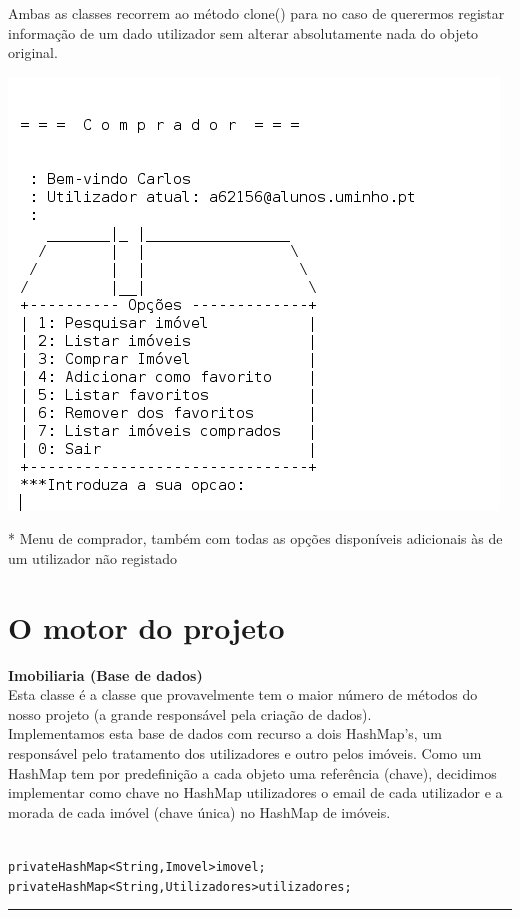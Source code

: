 \documentclass[12pt]{article}
\newenvironment{code}                    
{\textbf{
} \hspace{1cm} \hrulefill \\ 
\smallskip 
\begin{center}
\begin{minipage}{0.9\textwidth} 
\begin{alltt}\small}
{\end{alltt}
\end{minipage}
\end{center}
\hrule\smallskip
}
\begin{document}
Ambas as classes recorrem ao método clone() para no caso de querermos registar informação de um dado utilizador sem alterar absolutamente nada do objeto original.

\includegraphics[scale=0.5]{009.png}
\\
\begin{footnotesize}
* Menu de comprador, também com todas as opções disponíveis adicionais às de um utilizador não registado
\end{footnotesize}
\pagebreak

\section{O motor do projeto}

\textbf{Imobiliaria (Base de dados)}
\\

Esta classe é a classe que provavelmente tem o maior número de métodos do nosso projeto (a grande responsável pela criação de dados).
\\

Implementamos esta base de dados com recurso a dois HashMap's, um responsável pelo tratamento dos utilizadores e outro pelos imóveis. 
Como um HashMap tem por predefinição a cada objeto uma referência (chave), decidimos implementar como chave no HashMap utilizadores o email de cada utilizador e a morada de cada imóvel (chave única) no HashMap de imóveis.
~\\
\begin{code}
private HashMap<String,Imovel> imovel;
private HashMap<String,Utilizadores> utilizadores;
\end{code}
~\\
\end{document}

